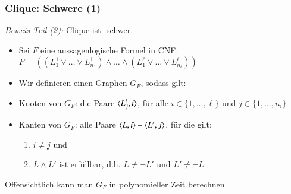 \documentclass[aspectratio=1610,onlymath]{beamer}
\begin{document}
\begin{frame}\frametitle{Clique: Schwere (1)}

\emph{Beweis Teil (2):} Clique ist -schwer.
\begin{itemize}
\item Sei $F$ eine aussagenlogische Formel in CNF:\\
$F=\left((L^1_1\vee \ldots\vee L^1_{n_1})\wedge \ldots\wedge (L^\ell_1\vee \ldots\vee L^\ell_{n_\ell})\right)$\pause
%
\item Wir definieren einen Graphen $G_F$, sodass gilt:\\[1ex]
\pause
%
\item \alert{Knoten von $G_F$:} die Paare $\langle{L^i_j,i}\rangle$, für alle $i\in\{1,\ldots,\ell\}$ und $j\in\{1,\ldots,n_i\}$\pause
%
\item \alert{Kanten von $G_F$:} alle Paare $\langle{L,i}\rangle-\langle{L',j}\rangle$, für die gilt:
\begin{enumerate}[(1)]
\item $i\neq j$ und
\item $L\wedge L'$ ist erfüllbar, d.h. $L\neq \neg L'$ und $L'\neq \neg L$
\end{enumerate}
\end{itemize}
Offensichtlich kann man $G_F$ in polynomieller Zeit berechnen

\end{frame}
\end{document}
